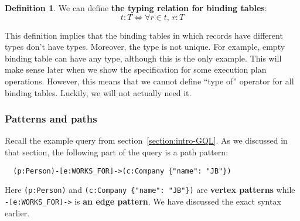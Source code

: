 \documentclass[14pt]{constructor-thesis}
\theoremstyle{definition}
\newtheorem{definition}{Definition}
\begin{document}
\begin{definition}
  We can define \textbf{the typing relation for binding tables}:
  $$ t : T \Longleftrightarrow \forall r \in t, \, r : T $$
\end{definition}

This definition implies that the binding tables in which records have different types don't have types. Moreover, the type is not unique. For example, empty binding table can have any type, although this is the only example. This will make sense later when we show the specification for some execution plan operations. However, this means that we cannot define ``type of'' operator for all binding tables. Luckily, we will not actually need it.

\subsubsection{Patterns and paths}
\label{sec:GQL-patterns-and-paths}

Recall the example query from section~\ref{section:intro-GQL}. As we discussed in that section, the following part of the query is a path pattern:
\begin{verbatim}
  (p:Person)-[e:WORKS_FOR]->(c:Company {"name": "JB"})
\end{verbatim}

Here \verb+(p:Person)+ and \verb+(c:Company {"name": "JB"})+ are \textbf{vertex patterns} while \verb+-[e:WORKS_FOR]->+ is \textbf{an edge pattern}. We have discussed the exact syntax earlier.



\end{document}
